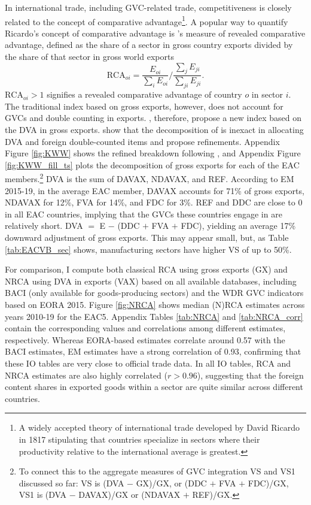 \documentclass[a4paper]{article}
\begin{document}
In international trade, including GVC-related trade, competitiveness is closely related to the concept of comparative advantage\footnote{A widely accepted theory of international trade developed by David Ricardo in 1817 stipulating that countries specialize in sectors where their productivity relative to the international average is greatest.}. 
A popular way to quantify Ricardo's concept of comparative advantage is \citet{balassa1965trade}'s measure of revealed comparative advantage, defined as the share of a sector in gross country exports divided by the share of that sector in gross world exports
%
\begin{equation}
\text{RCA}_{oi} = \frac{E_{oi}}{\sum_i E_{oi}} \Bigg/ \frac{\sum_j E_{ji}}{\sum_{ji} E_{ji}}.
\end{equation}
%
$\text{RCA}_{oi}>1$ signifies a revealed comparative advantage of country $o$ in sector $i$. The traditional index based on gross exports, however, does not account for GVCs and double counting in exports. \citet{koopman2014tracing}, therefore, propose a new index based on the DVA in gross exports. \citet{borin2019measuring} show that the decomposition of \citet{koopman2014tracing} is inexact in allocating DVA and foreign double-counted items and propose refinements. Appendix Figure \ref{fig:KWW} shows the refined breakdown following \citet{borin2019measuring}, and Appendix Figure \ref{fig:KWW_fill_ts} plots the decomposition of gross exports for each of the EAC members.\footnote{To connect this to the aggregate measures of GVC integration VS and VS1 discussed so far: VS is (DVA $-$ GX)/GX, or (DDC $+$ FVA $+$ FDC)/GX, VS1 is (DVA $-$ DAVAX)/GX or (NDAVAX $+$ REF)/GX. \vspace{-5mm}} DVA is the sum of DAVAX, NDAVAX, and REF. According to EM 2015-19, in the average EAC member, DAVAX accounts for 71\% of gross exports, NDAVAX for 12\%, FVA for 14\%, and FDC for 3\%. REF and DDC are close to 0 in all EAC countries, implying that the GVCs these countries engage in are relatively short. DVA $=$ E $-$ (DDC $+$ FVA $+$ FDC), yielding an average 17\% downward adjustment of gross exports. This may appear small, but, as Table \ref{tab:EACVB_sec} shows, manufacturing sectors have higher VS of up to 50\%. \newline
 
For comparison, I compute both classical RCA using gross exports (GX) and NRCA using DVA in exports (VAX) based on all available databases, including BACI (only available for goods-producing sectors) and the WDR GVC indicators based on EORA 2015. Figure \ref{fig:NRCA} shows median (N)RCA estimates across years 2010-19 for the EAC5. Appendix Tables \ref{tab:NRCA} and \ref{tab:NRCA_corr} contain the corresponding values and correlations among different estimates, respectively. Whereas EORA-based estimates correlate around 0.57 with the BACI estimates, EM estimates have a strong correlation of 0.93, confirming that these IO tables are very close to official trade data. In all IO tables, RCA and NRCA estimates are also highly correlated ($r > 0.96$), suggesting that the foreign content shares in exported goods within a sector are quite similar across different countries.
\end{document}
